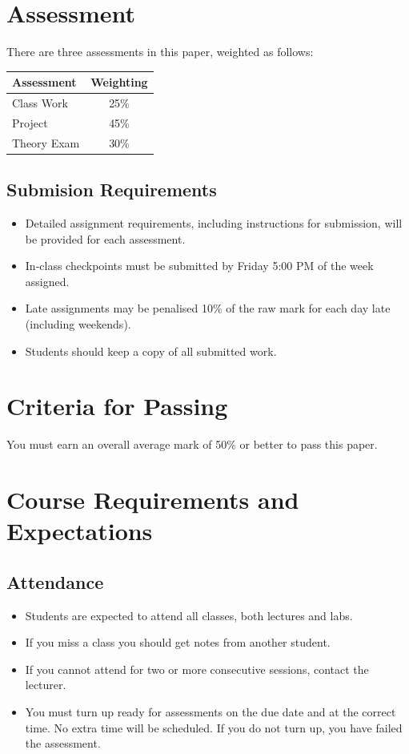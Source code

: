 \documentclass{article}
\begin{document}
\section*{Assessment}
There are three assessments in this paper, weighted as follows:


\begin{tabular}{|l|c|}
\hline
Assessment &  Weighting \\ \hline
 Class Work & 25\% \\ \hline
 Project & 45\% \\ \hline
 Theory Exam & 30\% \\ \hline
\end{tabular}
\subsection*{Submision Requirements}
\begin{itemize}
	\item Detailed assignment requirements, including instructions for submission, will be provided for each assessment.
        \item In-class checkpoints must be submitted by Friday 5:00 PM of the week assigned.
	\item Late assignments may be penalised 10\% of the raw mark for each day late (including weekends).
	\item Students should keep a copy of all submitted work.
\end{itemize}

\section*{Criteria for Passing}
You must earn an overall average mark of 50\% or better to pass this paper.

\section*{Course Requirements and Expectations}
\subsection*{Attendance}
\begin{itemize}
 \item Students are expected to attend all classes, both lectures and labs.
 \item If you miss a class you should get notes from another student.
 \item If you cannot attend for two or more consecutive sessions, contact the lecturer.
 \item You must turn up ready for assessments on the due date and at the correct time. No extra time will be scheduled. If you do not turn up, you have failed the assessment.
\end{itemize}
\end{document}
